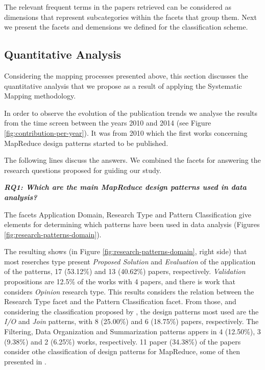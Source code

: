 The relevant frequent terms in the papers retrieved can be considered as
dimensions that represent subcategories within the facets that group them. Next
we present the facets and demensions we defined for the classification scheme. 

\subsection{Quantitative Analysis}


Considering the mapping processes presented above, this
section discusses the quantitative analysis that we propose as a result of
applying the Systematic Mapping methodology.  

In order to observe the evolution of the publication trends we analyse the
results from the time screen between the years 2010 and 2014 (see Figure
\ref{fig:contribution-per-year}). It was from 2010 which the first works
concerning MapReduce design patterns started to be published.         

The following lines discuss the answers. We combined the facets for answering
the research questions proposed for guiding our study. 

\bigskip
\textbf{\textit{RQ1: Which are the main MapReduce design patterns used in data
analysis?}} 
    
The facets Application Domain, Research Type and Pattern Classification give
elements for determining which patterns have been used in data analysis (Figures
\ref{fig:research-patterns-domain}). 

The resulting shows (in Figure \ref{fig:research-patterns-domain}, right side)
that most reserches type present \textit{Proposed Solution} and
\textit{Evaluation} of the application of the patterns, 17 (53.12\%) and 13
(40.62\%) papers, respectively. \textit{Validation} propositions are 12.5\% of
the works with 4 papers, and there is work that considers \textit{Opinion}
research type. This results considers the relation between the Research Type
facet and the Pattern Classification facet. From those, and considering the
classification proposed by \cite{White:2012}, the design patterns most used are
the \textit{I/O} and \textit{Join} patterns, with 8 (25.00\%) and 6 (18.75\%)
papers, respectively.  The Filtering, Data Organization and Summarization
patterns appers in 4 (12.50\%), 3 (9.38\%) and 2 (6.25\%) works,
respectively. 11 paper (34.38\%) of the papers consider othe classification of
design patterns for MapReduce, some of then presented in \cite{pig-designpattern:2014}.
 
